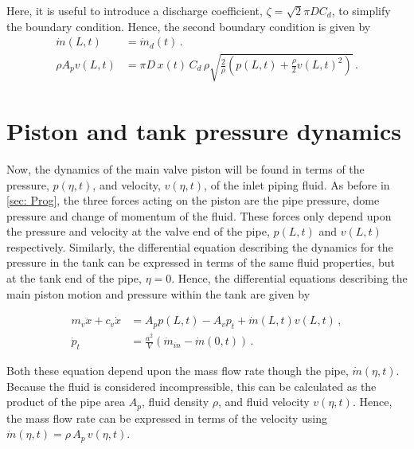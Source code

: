 Here, it is useful to introduce a discharge coefficient, $\zeta = \sqrt{2} \pi D C_d$, to simplify the boundary condition. Hence, the second boundary condition is given by
~
\begin{equation} \label{eq: QWMBoundary2}
\begin{split}
    \dot{m}(L,t) &= \dot{m}_d(t) \, . \\
    \rho A_p v(L,t) &= \pi D \, x(t) \, C_d \, \rho \sqrt{\frac{2}{\rho} \left( p(L,t) + \frac{\rho}{2} v(L,t)^2 \right)} \, .
\end{split}
\end{equation}

\section{Piston and tank pressure dynamics} \label{subsec: PistonTankDyn}

Now, the dynamics of the main valve piston will be found in terms of the pressure, $p(\eta,t)$, and velocity, $v(\eta,t)$, of the inlet piping fluid. As before in \cref{sec: Prog}, the three forces acting on the piston are the pipe pressure, dome pressure and change of momentum of the fluid. These forces only depend upon the pressure and velocity at the valve end of the pipe, $p(L,t)$ and $v(L,t)$ respectively. Similarly, the differential equation describing the dynamics for the pressure in the tank can be expressed in terms of the same fluid properties, but at the tank end of the pipe, $\eta = 0$. Hence, the differential equations describing the main piston motion and pressure within the tank are given by

\begin{equation} \label{eq: ValveODEsPipe}
\begin{split}
    m_v \ddot{x} + c_v \dot{x} &= A_p p(L,t) - A_v p_t + \dot{m}(L,t)
    v(L,t) %
    \, , \\
    \dot{p}_t &= \frac{a^2}{V} \left( \dot{m}_{in} - \dot{m}(0,t) \right) \, .
\end{split}
\end{equation}

Both these equation depend upon the mass flow rate though the pipe, $\dot{m}(\eta,t)$. Because the fluid is considered incompressible, this can be calculated as the product of the pipe area $A_p$, fluid density $\rho$, and fluid velocity $v(\eta,t)$. Hence, the mass flow rate can be expressed in terms of the velocity using $\dot{m}(\eta,t) = \rho \, A_p \, v(\eta,t)$.

